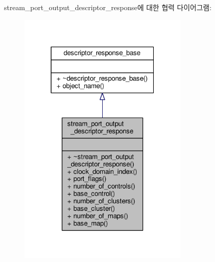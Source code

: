 stream\+\_\+port\+\_\+output\+\_\+descriptor\+\_\+response에 대한 협력 다이어그램\+:
\nopagebreak
\begin{figure}[H]
\begin{center}
\leavevmode
\includegraphics[width=232pt]{classavdecc__lib_1_1stream__port__output__descriptor__response__coll__graph}
\end{center}
\end{figure}

